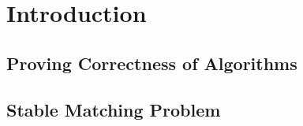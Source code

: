 
\section{Introduction}

\subsection{Proving Correctness of Algorithms}
\subsection{Stable Matching Problem}
